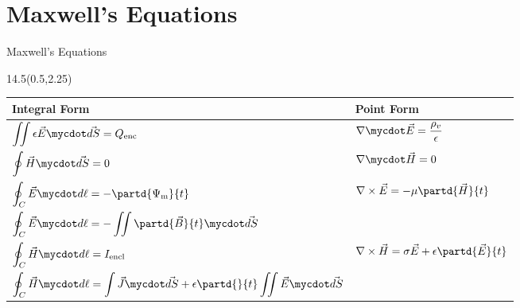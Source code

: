 \section{Maxwell's Equations}
\begin{frame}{Maxwell's Equations}
\begin{textblock}{14.5}(0.5,2.25)

\begin{center}
\begin{tabular}{| l | l |}
\hline
\textbf{Integral Form} & \textbf{Point Form}  \\\hline
 ${\displaystyle \iint \epsilon\vec{E}\mycdot \vec{dS}} = Q_{\text{enc}} $ 
 & $\nabla\mycdot\vec{E}  = \dfrac{\rho_v}{\epsilon}$   \\ \hline
${\displaystyle\oint \vec{H}\mycdot\vec{dS} } = 0 $ 
& $\nabla\mycdot\vec{H} = 0$ \\ \hline
$\begin{aligned}
\displaystyle\oint_C \vec{E}\mycdot d\ell &=-\partd{\Psi_{\text{m}}}{t} \\
\displaystyle\oint_C \vec{E}\mycdot d\ell &=  -\iint\partd{\vec{B}}{t}\mycdot \vec{dS}
\end{aligned}$
&$\begin{aligned}
\nabla\times\vec{E} &= -\mu\partd{\vec{H}}{t} \\
\end{aligned}$
\\ \hline
$\begin{aligned}
\displaystyle\oint_C\vec{H}\mycdot d\ell &= I_{\text{encl}} \\ 
\displaystyle\oint_C\vec{H}\mycdot d\ell &= \int \vec{J}\mycdot\vec{dS} 
 + \epsilon\partd{}{t}\iint\vec{E}\mycdot \vec{dS}
\end{aligned} $
& $\begin{aligned}
\nabla\times\vec{H} &= \sigma \vec{E} + \epsilon\partd{\vec{E}}{t} \\ 
 \end{aligned}$ \\ \hline
\end{tabular}
\end{center}

\end{textblock}
\end{frame}

